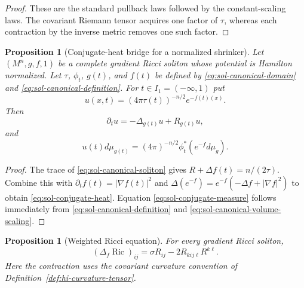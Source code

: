 \documentclass[10pt]{coll-l}
\newtheorem{proposition}[theorem]{Proposition}
\theoremstyle{definition}
\theoremstyle{remark}
\numberwithin{section}{chapter}
\numberwithin{equation}{chapter}
\newcommand{\Ric}{\operatorname{Ric}}
\begin{document}
\begin{proof}
These are the standard pullback laws followed by the constant-scaling laws.
The covariant Riemann tensor acquires one factor of $\tau$, whereas each
contraction by the inverse metric removes one such factor.
\end{proof}

\begin{proposition}[Conjugate-heat bridge for a normalized shrinker]
\label{prop:sol-conjugate-heat}
Let $(M^n,g,f,1)$ be a complete gradient Ricci soliton whose potential is
Hamilton normalized.  Let $\tau$, $\phi_t$, $g(t)$, and $f(t)$ be defined by
\eqref{eq:sol-canonical-domain} and
\eqref{eq:sol-canonical-definition}.  For $t\in I_1=(-\infty,1)$ put
\[
 u(x,t)=(4\pi\tau(t))^{-n/2}e^{-f(t)(x)}.
\]
Then
\begin{equation}
       \partial_tu=-\Delta_{g(t)}u+R_{g(t)}u,             \label{eq:sol-conjugate-heat}
\end{equation}
and
\begin{equation}
 u(t)d\mu_{g(t)}
   =(4\pi)^{-n/2}\phi_t^*(e^{-f}d\mu_g).                 \label{eq:sol-conjugate-measure}
\end{equation}
\end{proposition}

\begin{proof}
The trace of \eqref{eq:sol-canonical-soliton} gives
$R+\Delta f(t)=n/(2\tau)$.  Combine this with
$\partial_tf(t)=|\nabla f(t)|^2$ and
$\Delta(e^{-f})=e^{-f}(-\Delta f+|\nabla f|^2)$ to obtain
\eqref{eq:sol-conjugate-heat}.  Equation
\eqref{eq:sol-conjugate-measure} follows immediately from
\eqref{eq:sol-canonical-definition} and
\eqref{eq:sol-canonical-volume-scaling}.
\end{proof}

\begin{proposition}[Weighted Ricci equation]
\label{prop:sol-weighted-ricci}
For every gradient Ricci soliton,
\begin{equation}
 (\Delta_f\Ric)_{ij}
   =\sigma R_{ij}-2R_{kij\ell}R^{k\ell}.                 \label{eq:sol-drift-ricci}
\end{equation}
Here the contraction uses the covariant curvature convention of
Definition~\ref{def:hi-curvature-tensor}.
\end{proposition}
\end{document}
